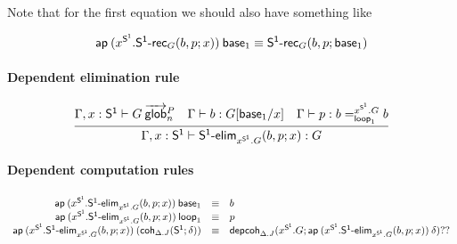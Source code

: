 Note that for the first equation we should also have something like
\begin{small}
  \[\mathsf{ap} \: {(x^{\mathsf{S^1}}.\mathsf{S^1\text{-}rec}_G(b, p; x))} \: {\mathsf{base}_{1}}
  \equiv \mathsf{S^1\text{-}rec}_G(b, p; \mathsf{base}_{1})\]
\end{small}

\paragraph{Dependent elimination rule}

\begin{small}
  \[
  \infer{\ofglob{\Gamma,x:\dsd{S^1}}{\dsd{S^1\text{-}elim}_{x^{\dsd{S^1}}.G}(b,
      p; x)}{G}} {\wfglob{\Gamma,x:\dsd{S^1}}{G}{P}n &
    \ofglob{\Gamma}{b}{G[\base{1}/x]} &
    \ofglob{\Gamma}{p}{\dhomj{x^{\dsd{S^1}}.G}{b}{b}{\lp{1}}}}
  \]
\end{small}

\paragraph{Dependent computation rules}

\begin{small}
  \[
  \begin{array}{rcl}
    \mathsf{ap} \: {(x^{\mathsf{S^1}}.\mathsf{S^1\text{-}elim}_{x^{\mathsf{S^1}}.G}(b, p; x))} \: {\mathsf{base}_{1}} & \equiv & b \\
    \mathsf{ap} \: {(x^{\mathsf{S^1}}.\mathsf{S^1\text{-}elim}_{x^{\mathsf{S^1}}.G}(b, p; x))} \: {\mathsf{loop}_{1}} & \equiv & p\\
    \mathsf{ap} \: {(x^{\mathsf{S^1}}.\mathsf{S^1\text{-}elim}_{x^{\mathsf{S^1}}.G}(b, p; x))} \: {(\mathsf{coh}_{\Delta.J} ({\mathsf{S^1}};{\delta}))} & \equiv &
    \mathsf{depcoh}_{\Delta.J} ({x^{\mathsf{S^1}}.G};{\mathsf{ap} \: {(x^{\mathsf{S^1}}.\mathsf{S^1\text{-}elim}_{x^{\mathsf{S^1}}.G}(b, p; x))} \: {\delta}}){??}
    \\
  \end{array}
  \]
\end{small}


